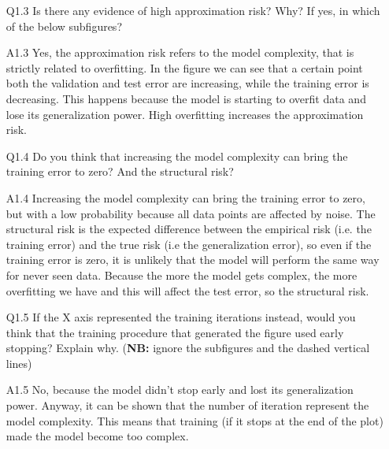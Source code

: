 \documentclass[11pt]{scrartcl}
\begin{document}
\begin{itemize}
\item[Q1.3] Is there any evidence of high approximation risk? Why? If yes, in which of the below subfigures?  
\item[A1.3] Yes, the approximation risk refers to the model complexity, that is strictly related to overfitting. In the figure we can see that a certain point both the validation and test error are increasing, while the training error is decreasing. This happens because the model is starting to overfit data and lose its generalization power. High overfitting increases the approximation risk.

\item[Q1.4] Do you think that increasing the model complexity can bring the training error to zero? And the structural risk?  
\item[A1.4] Increasing the model complexity can bring the training error to zero, but with a low probability because all data points are affected by noise. The structural risk is the expected difference between the empirical risk (i.e. the training error) and the true risk (i.e the generalization error), so even if the training error is zero, it is unlikely that the model will perform the same way for never seen data. Because the more the model gets complex, the more overfitting we have and this will affect the test error, so the structural risk.

\item[Q1.5] If the X axis represented the training iterations instead, would you think that the training procedure that generated the figure used early stopping? Explain why. (\textbf{NB:} ignore the subfigures and the dashed vertical lines)
\item[A1.5] No, because the model didn't stop early and lost its generalization power. Anyway, it can be shown that the number of iteration represent the model complexity. This means that training (if it stops at the end of the plot) made the model become too complex.

\end{itemize}
\end{document}
